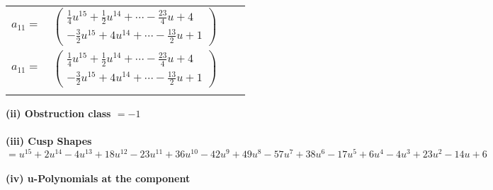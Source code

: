 \documentclass[1p]{elsarticle_modified}
\theoremstyle{definition}
\begin{document}
\begin{tabular}{m{7pt} m{180pt} m{7pt} m{180pt} }
\flushright $a_{11}=$&$\begin{pmatrix}\frac{1}{4} u^{15}+\frac{1}{2} u^{14}+\cdots-\frac{23}{4} u+4\\-\frac{3}{2} u^{15}+4 u^{14}+\cdots-\frac{13}{2} u+1\end{pmatrix}$\\ \flushright $a_{11}=$&$\begin{pmatrix}\frac{1}{4} u^{15}+\frac{1}{2} u^{14}+\cdots-\frac{23}{4} u+4\\-\frac{3}{2} u^{15}+4 u^{14}+\cdots-\frac{13}{2} u+1\end{pmatrix}$\\&\end{tabular}
\flushleft \textbf{(ii) Obstruction class $= -1$}\\~\\
\flushleft \textbf{(iii) Cusp Shapes $= u^{15}+2 u^{14}-4 u^{13}+18 u^{12}-23 u^{11}+36 u^{10}-42 u^9+49 u^8-57 u^7+38 u^6-17 u^5+6 u^4-4 u^3+23 u^2-14 u+6$}\\~\\
\newpage\renewcommand{\arraystretch}{1}
\flushleft \textbf{(iv) u-Polynomials at the component}\newline \\
\end{document}
